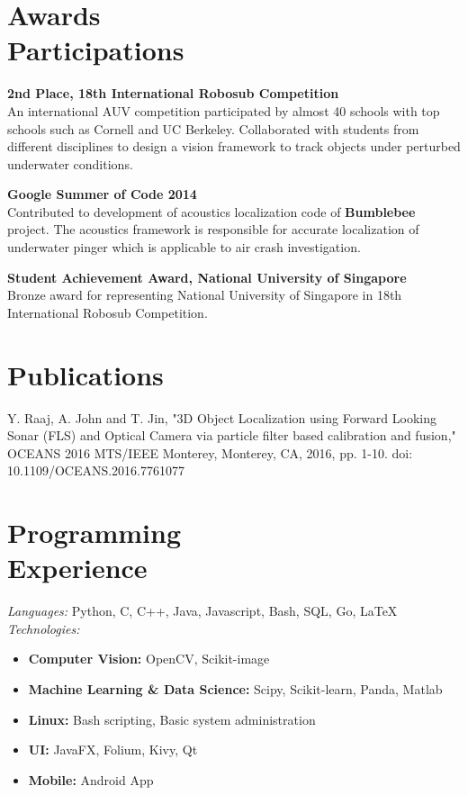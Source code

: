\documentclass[margin,line]{resume}
\begin{document}
\begin{resume}
    \section{\mysidestyle Awards\\Participations}

    \textbf{2nd Place, 18th International Robosub Competition}\\
    An international AUV competition participated by almost 40 schools with top
    schools such as Cornell and UC Berkeley. Collaborated with students from
    different disciplines to design a vision framework to track objects under
    perturbed underwater conditions.

    \textbf{Google Summer of Code 2014}\\
    Contributed to development of acoustics localization code of
    \textbf{Bumblebee} project. The acoustics framework is responsible for
    accurate localization of underwater pinger which is applicable to air crash investigation.

    \textbf{Student Achievement Award, National University of Singapore}\\
    Bronze award for representing National University of Singapore in 18th
    International Robosub Competition.

    \section{\mysidestyle Publications}
    Y. Raaj, A. John and T. Jin, "3D Object Localization using Forward Looking
    Sonar (FLS) and Optical Camera via particle filter based calibration and
    fusion," OCEANS 2016 MTS/IEEE Monterey, Monterey, CA, 2016, pp. 1-10.
    doi: 10.1109/OCEANS.2016.7761077

    \section{\mysidestyle Programming\\Experience}

    \emph{Languages:} Python, C, C++, Java, Javascript, Bash, SQL, Go, \LaTeX \\
    \emph{Technologies:} \\
    \begin{itemize}
      \item \textbf{Computer Vision:} OpenCV, Scikit-image
      \item \textbf{Machine Learning \& Data Science:} Scipy, Scikit-learn,
        Panda, Matlab
      \item \textbf{Linux:} Bash scripting, Basic system administration
      \item \textbf{UI:} JavaFX, Folium, Kivy, Qt
      \item \textbf{Mobile:} Android App


\end{itemize}
\end{resume}
\end{document}
